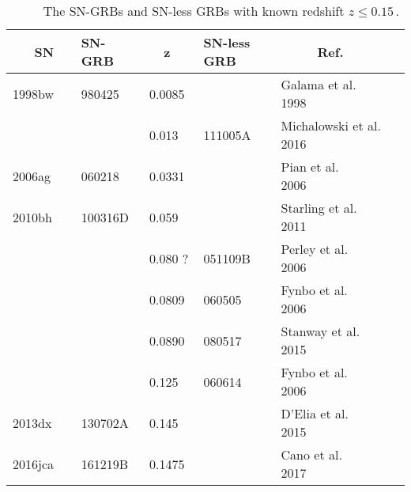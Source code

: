 \documentclass[twocolumn]{aastex61}
\begin{document}
\begin{table*}
\centering
\caption{~~~~~The SN-GRBs and SN-less GRBs with known redshift $z\leq 
0.15$\,.}

\begin{tabular}{l l l l l l}
\hline
\hline
~~~SN~~&SN-GRB~&~~z~&SN-less GRB&~~~~~Ref.~~\\
\hline
1998bw & 980425~& 0.0085 &         & Galama et al. 1998~~~~ \\
       &        & 0.013~ & 111005A & Michalowski et al. 2016\\
2006ag & 060218~& 0.0331 &         & Pian et al. 2006~~~~~~~\\
2010bh & 100316D& 0.059~ &         & Starling et al. 2011~~~\\
       &        & 0.080 ?& 051109B & Perley et al. 2006~~~~~~\\
       &        & 0.0809~& 060505~ & Fynbo et al. 2006~~~~~~\\
       &        & 0.0890 & 080517~ & Stanway et al. 2015~~~~\\
       &        & 0.125  & 060614~ & Fynbo et al. 2006~~~~~ \\
2013dx & 130702A& 0.145  &         & D'Elia et al. 2015~~~~~\\
2016jca& 161219B& 0.1475 &         & Cano et al. 2017~~~~~~~\\
\hline
\end{tabular}
\end{table*}
\end{document}
